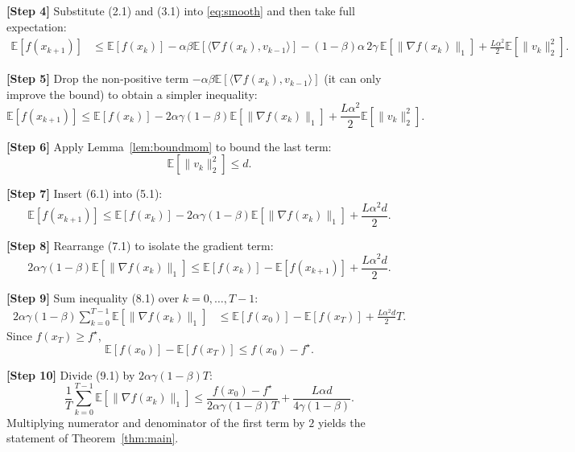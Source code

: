 \documentclass[11pt]{article}
\newcommand{\E}{\mathbb{E}}
\begin{document}
\noindent\textbf{[Step 4]} Substitute (2.1) and (3.1) into \eqref{eq:smooth} and then take full expectation:
\begin{align}
\E[f(x_{k+1})] 
&\le \E[f(x_k)] 
   -\alpha\beta\E[\langle\nabla f(x_k),v_{k-1}\rangle]
   -(1-\beta)\alpha\,2\gamma\,\E[\|\nabla f(x_k)\|_{1}]
   +\frac{L\alpha^{2}}{2}\E[\|v_k\|_2^{2}].
\label{eq:afterexp}
\end{align}

\noindent\textbf{[Step 5]} Drop the non‑positive term $-\alpha\beta\E[\langle\nabla f(x_k),v_{k-1}\rangle]$ (it can only improve the bound) to obtain a simpler inequality:
\begin{equation}
\E[f(x_{k+1})] 
\le \E[f(x_k)] 
   -2\alpha\gamma(1-\beta)\E[\|\nabla f(x_k)\|_{1}]
   +\frac{L\alpha^{2}}{2}\E[\|v_k\|_2^{2}].
\tag{5.1}
\end{equation}

\noindent\textbf{[Step 6]} Apply Lemma~\ref{lem:boundmom} to bound the last term:
\[
\E[\|v_k\|_2^{2}]\le d .
\tag{6.1}
\]

\noindent\textbf{[Step 7]} Insert (6.1) into (5.1):
\begin{equation}
\E[f(x_{k+1})] 
\le \E[f(x_k)] 
   -2\alpha\gamma(1-\beta)\E[\|\nabla f(x_k)\|_{1}]
   +\frac{L\alpha^{2}d}{2}.
\tag{7.1}
\end{equation}

\noindent\textbf{[Step 8]} Rearrange (7.1) to isolate the gradient term:
\begin{equation}
2\alpha\gamma(1-\beta)\E[\|\nabla f(x_k)\|_{1}]
\le \E[f(x_k)]-\E[f(x_{k+1})] +\frac{L\alpha^{2}d}{2}.
\tag{8.1}
\end{equation}

\noindent\textbf{[Step 9]} Sum inequality (8.1) over $k=0,\dots,T-1$:
\begin{align}
2\alpha\gamma(1-\beta)\sum_{k=0}^{T-1}\E[\|\nabla f(x_k)\|_{1}]
&\le \E[f(x_0)]-\E[f(x_T)] + \frac{L\alpha^{2}d}{2}T.
\tag{9.1}
\end{align}
Since $f(x_T)\ge f^{\star}$,
\[
\E[f(x_0)]-\E[f(x_T)]\le f(x_0)-f^{\star}.
\tag{9.2}
\]

\noindent\textbf{[Step 10]} Divide (9.1) by $2\alpha\gamma(1-\beta)T$:
\begin{equation}
\frac{1}{T}\sum_{k=0}^{T-1}\E[\|\nabla f(x_k)\|_{1}]
\le
\frac{f(x_0)-f^{\star}}{2\alpha\gamma(1-\beta)T}
+\frac{L\alpha d}{4\gamma(1-\beta)}.
\tag{10.1}
\end{equation}
Multiplying numerator and denominator of the first term by $2$ yields the statement of Theorem~\ref{thm:main}.
\end{document}
